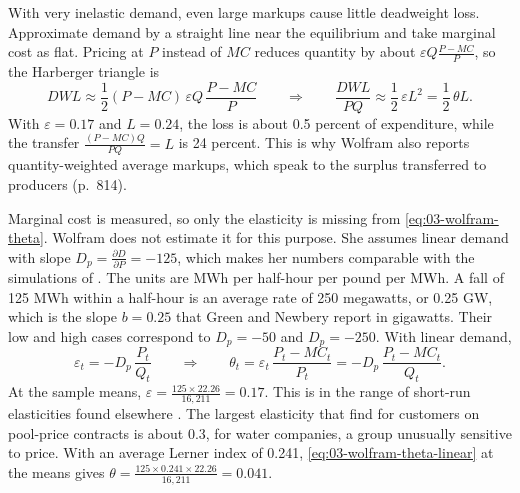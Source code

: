 \begin{remark}\label{rem:03-wolfram-welfare}
With very inelastic demand, even large markups cause little deadweight loss. Approximate demand by a straight line near
the equilibrium and take marginal cost as flat. Pricing at $P$ instead of $MC$ reduces quantity by about
$\varepsilon Q\frac{P - MC}{P}$, so the Harberger triangle is
\begin{equation*}
DWL \approx \frac{1}{2}(P - MC)\,\varepsilon Q\,\frac{P - MC}{P}
\qquad\Longrightarrow\qquad
\frac{DWL}{PQ} \approx \frac{1}{2}\,\varepsilon L^2 = \frac{1}{2}\,\theta L.
\end{equation*}
With $\varepsilon = 0.17$ and $L = 0.24$, the loss is about 0.5 percent of expenditure, while the transfer
$\frac{(P - MC)Q}{PQ} = L$ is 24 percent. This is why Wolfram also reports quantity-weighted average markups, which speak
to the surplus transferred to producers (p.~814).
\end{remark}

Marginal cost is measured, so only the elasticity is missing from \eqref{eq:03-wolfram-theta}. Wolfram does not
estimate it for this purpose. She assumes linear demand with slope $D_p = \frac{\partial D}{\partial P} = -125$, which
makes her numbers comparable with the simulations of \citet{GreenNewbery1992} \citep[p.~811]{Wolfram1999}. The units are
MWh per half-hour per pound per MWh. A fall of 125 MWh within a half-hour is an average rate of 250 megawatts, or
0.25 GW, which is the slope $b = 0.25$ that Green and Newbery report in gigawatts. Their low and high cases correspond to
$D_p = -50$ and $D_p = -250$. With linear demand,
\begin{equation}\label{eq:03-wolfram-theta-linear}
\varepsilon_t = -D_p\,\frac{P_t}{Q_t}
\qquad\Longrightarrow\qquad
\theta_t = \varepsilon_t\,\frac{P_t - MC_t}{P_t} = -D_p\,\frac{P_t - MC_t}{Q_t}.
\end{equation}
At the sample means, $\varepsilon = \frac{125 \times 22.26}{16{,}211} = 0.17$. This is in the range of short-run
elasticities found elsewhere \citep{Taylor1975}. The largest elasticity that \citet{PatrickWolak1997} find for customers
on pool-price contracts is about 0.3, for water companies, a group unusually sensitive to price. With an average Lerner
index of 0.241, \eqref{eq:03-wolfram-theta-linear} at the means gives $\theta = \frac{125 \times 0.241 \times
22.26}{16{,}211} = 0.041$.

